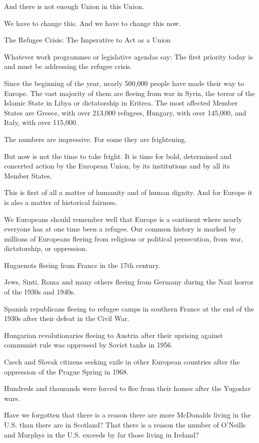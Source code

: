 \documentclass[a4paper,11pt]{article}
\begin{document}
And there is not enough Union in this Union.

 

We have to change this. And we have to change this now.

 

The Refugee Crisis: The Imperative to Act as a Union

Whatever work programmes or legislative agendas say: The first priority today is and must be addressing the refugee crisis.

Since the beginning of the year, nearly 500,000 people have made their way to Europe. The vast majority of them are fleeing from war in Syria, the terror of the Islamic State in Libya or dictatorship in Eritrea. The most affected Member States are Greece, with over 213,000 refugees, Hungary, with over 145,000, and Italy, with over 115,000.

The numbers are impressive. For some they are frightening.

But now is not the time to take fright. It is time for bold, determined and concerted action by the European Union, by its institutions and by all its Member States.

This is first of all a matter of humanity and of human dignity. And for Europe it is also a matter of historical fairness.

We Europeans should remember well that Europe is a continent where nearly everyone has at one time been a refugee. Our common history is marked by millions of Europeans fleeing from religious or political persecution, from war, dictatorship, or oppression.

Huguenots fleeing from France in the 17th century.

Jews, Sinti, Roma and many others fleeing from Germany during the Nazi horror of the 1930s and 1940s.

Spanish republicans fleeing to refugee camps in southern France at the end of the 1930s after their defeat in the Civil War.

Hungarian revolutionaries fleeing to Austria after their uprising against communist rule was oppressed by Soviet tanks in 1956.

Czech and Slovak citizens seeking exile in other European countries after the oppression of the Prague Spring in 1968.

Hundreds and thousands were forced to flee from their homes after the Yugoslav wars.

Have we forgotten that there is a reason there are more McDonalds living in the U.S. than there are in Scotland? That there is a reason the number of O'Neills and Murphys in the U.S. exceeds by far those living in Ireland?
\end{document}

